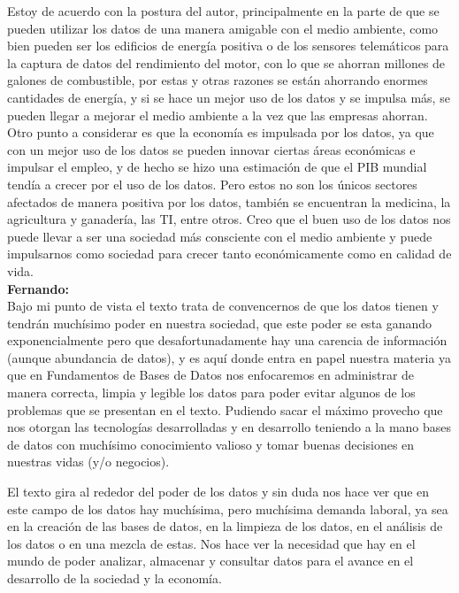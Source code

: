 \documentclass[12pt,a4paper]{article}
\begin{document}
\begin{enumerate}
\begin{enumerate}
				Estoy de acuerdo con la postura del autor, principalmente en la parte de que 
				se pueden utilizar los datos de una manera amigable con el medio ambiente, 
				como bien pueden ser los edificios de energía positiva o de los sensores 
				telemáticos para la captura de datos del rendimiento del motor, con lo que se 
				ahorran millones de galones de combustible, por estas y otras razones se están 
				ahorrando enormes cantidades de energía, y si se hace un mejor uso de los datos 
				y se impulsa más, se pueden llegar a mejorar el medio ambiente a la vez que las 
				empresas ahorran. Otro punto a considerar es que la economía es impulsada por los 
				datos, ya que con un mejor uso de los datos se pueden innovar ciertas áreas 
				económicas e impulsar el empleo, y de hecho se hizo una estimación de que el 
				PIB mundial tendía a crecer por el uso de los datos.
				Pero estos no son los únicos sectores afectados de manera positiva por los datos, 
				también se encuentran la medicina, la agricultura y ganadería, las TI, entre otros.
				Creo que el buen uso de los datos nos puede llevar a ser una sociedad más consciente
				con el medio ambiente y puede impulsarnos como sociedad para crecer tanto económicamente 
				como en calidad de vida.\\

				\textbf{Fernando:}\\
				Bajo mi punto de vista el texto trata de convencernos de que los datos tienen y tendrán muchísimo poder en nuestra 
				sociedad, que este poder se esta ganando exponencialmente pero que desafortunadamente hay una carencia de información 
				(aunque abundancia de datos), y es aquí donde entra en papel nuestra materia ya que en Fundamentos de Bases de Datos nos
				enfocaremos en administrar de manera correcta, limpia y legible los datos para poder evitar algunos de los problemas que
				se presentan en el texto. Pudiendo sacar el máximo provecho que nos otorgan las tecnologías desarrolladas y en desarrollo 
				teniendo a la mano bases de datos con muchísimo conocimiento valioso y tomar buenas decisiones en nuestras vidas (y/o 
				negocios).

				El texto gira al rededor del poder de los datos y sin duda nos hace ver que en este campo de los datos hay muchísima,
				pero muchísima demanda laboral, ya sea en la creación de las bases de datos, en la limpieza de los datos, en el análisis 
				de los datos o en una mezcla de estas. Nos hace ver la necesidad que hay en el mundo de poder analizar, almacenar y 
				consultar datos para el avance en el desarrollo de la sociedad y la economía.


\end{enumerate}
\end{enumerate}
\end{document}
